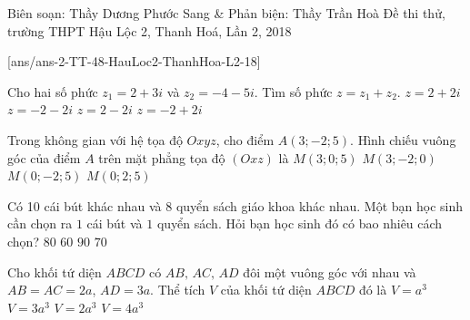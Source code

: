 \begin{name}
	{Biên soạn: Thầy Dương Phước Sang \& Phản biện: Thầy Trần Hoà}
	{Đề thi thử, trường THPT Hậu Lộc 2, Thanh Hoá, Lần 2, 2018}
\end{name}
\setcounter{ex}{0}
[ans/ans-2-TT-48-HauLoc2-ThanhHoa-L2-18]

\begin{ex}%
	Cho hai số phức $z_1=2+3i$ và $z_2=-4-5i$. Tìm số phức $z=z_1+z_2$.
	\choice
	{$z=2+2i$}
	{\True $z=-2-2i$}
	{$z=2-2i$}
	{$z=-2+2i$}
\end{ex}
\begin{ex}%
	Trong không gian với hệ tọa độ $Oxyz$, cho điểm $A(3;-2;5)$. Hình chiếu vuông góc của điểm $A$ trên mặt phẳng tọa độ $(Oxz)$ là
	\choice
	{\True $M(3;0;5)$}
	{$M(3;-2;0)$}
	{$M(0;-2;5)$}
	{$M(0;2;5)$}
\end{ex}
\begin{ex}%
	Có 10 cái bút khác nhau và 8 quyển sách giáo khoa khác nhau. Một bạn học sinh cần chọn ra $1$ cái bút và $1$ quyển sách. Hỏi bạn học sinh đó có bao nhiêu cách chọn?
	\choice
	{\True $80$}
	{$60$}
	{$90$}
	{$70$}
\end{ex}
\begin{ex}%
	Cho khối tứ diện $ABCD$ có $AB,\,AC,\,AD$ đôi một vuông góc với nhau và $AB=AC=2a$, $AD=3a$. Thể tích $V$ của khối tứ diện $ABCD$ đó là
	\choice
	{$V=a^3$}
	{$V=3a^3$}
	{\True $V=2a^3$}
	{$V=4a^3$}
\end{ex}

